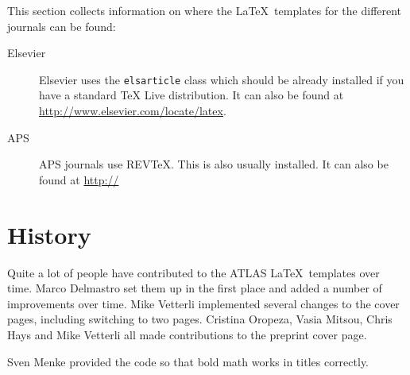 \documentclass[koma,UKenglish]{style/atlasdoc}
\begin{document}
This section collects information on where the \LaTeX\ templates for the different journals can be found:
\begin{description}
\item[Elsevier] Elsevier uses the \texttt{elsarticle} class which should be already installed if you have a standard 
	TeX Live distribution. 
	It can also be found at \url{http://www.elsevier.com/locate/latex}.
\item[APS] APS journals use REV\TeX. This is also usually installed.
	It can also be found at \url{http://} 
\end{description}

\section*{History}

Quite a lot of people have contributed to the ATLAS \LaTeX\ templates over time.
Marco Delmastro set them up in the first place and added a number of improvements over time.
Mike Vetterli implemented several changes to the cover pages, including switching to two pages.
Cristina Oropeza, Vasia Mitsou, Chris Hays and Mike Vetterli all made contributions to the preprint cover page.

Sven Menke provided the code so that bold math works in titles correctly.
\end{document}
